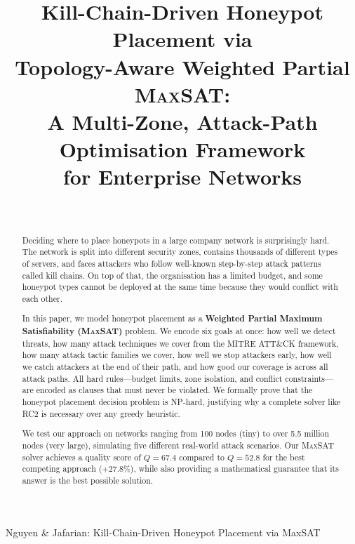 \documentclass[journal]{IEEEtran}
\newcommand{\maxsat}{\textsc{MaxSAT}}
\begin{document}
\title{Kill-Chain-Driven Honeypot Placement via\\
       Topology-Aware Weighted Partial \textsc{MaxSAT}:\\
       A Multi-Zone, Attack-Path Optimisation Framework\\
       for Enterprise Networks}

\author{%
  \\
}

%
{Nguyen \& Jafarian: Kill-Chain-Driven Honeypot Placement via MaxSAT}

\maketitle

\begin{abstract}
Deciding where to place honeypots in a large company network
is surprisingly hard.
The network is split into different security zones, contains
thousands of different types of servers, and faces attackers
who follow well-known step-by-step attack patterns called
kill chains.
On top of that, the organisation has a limited budget, and
some honeypot types cannot be deployed at the same time
because they would conflict with each other.

In this paper, we model honeypot placement as a
\textbf{Weighted Partial Maximum Satisfiability (\maxsat{})}
problem.
We encode six goals at once: how well we detect threats,
how many attack techniques we cover from the MITRE ATT\&CK
framework, how many attack tactic families we cover, how well
we stop attackers early, how well we catch attackers at the
end of their path, and how good our coverage is across all
attack paths.
All hard rules---budget limits, zone isolation, and conflict
constraints---are encoded as clauses that must never be
violated.
We formally prove that the honeypot placement decision
problem is NP-hard, justifying why a complete solver like
RC2 is necessary over any greedy heuristic.

We test our approach on networks ranging from 100 nodes
(tiny) to over 5.5 million nodes (very large), simulating
five different real-world attack scenarios.
Our \maxsat{} solver achieves a quality score of $Q=67.4$
compared to $Q=52.8$ for the best competing approach
($+27.8\%$), while also providing a mathematical guarantee
that its answer is the best possible solution.
\end{abstract}
\end{document}
